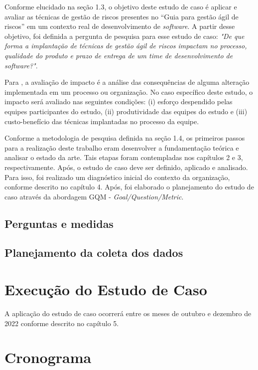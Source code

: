 \documentclass[
    12pt,       %
    openright,      %
    twoside,      %
    a4paper,      %
    english,      %
    french,       %
    spanish,      %
    brazil,       %
    ]{abntex2}
\begin{document}
Conforme elucidado na seção 1.3, o objetivo deste estudo de caso é aplicar e avaliar as técnicas de gestão de riscos presentes no “Guia para gestão ágil de riscos” \cite{Vieira:2020} em um contexto real de desenvolvimento de \textit{software}. A partir desse objetivo, foi definida a pergunta de pesquisa para esse estudo de caso: \textit{"De que forma a implantação de técnicas de gestão ágil de riscos impactam no processo, qualidade do produto e prazo de entrega de um time de desenvolvimento de software?"}. 

Para , a avaliação de impacto é a análise das consequências de alguma alteração implementada em um processo ou organização. No caso específico deste estudo, o impacto será avaliado nas seguintes condições: (i) esforço despendido pelas equipes participantes do estudo, (ii) produtividade das equipes do estudo e (iii) custo-benefício das técnicas implantadas no processo da equipe. 

Conforme a metodologia de pesquisa definida na seção 1.4, os primeiros passos para a realização deste trabalho eram desenvolver a fundamentação teórica e analisar o estado da arte. Tais etapas foram contempladas nos capítulos 2 e 3, respectivamente. Após, o estudo de caso deve ser definido, aplicado e analisado. Para isso, foi realizado um diagnóstico inicial do contexto da organização, conforme descrito no capítulo 4. Após, foi elaborado o planejamento do estudo de caso através da abordagem GQM - \textit{Goal/Question/Metric}.

\section{Perguntas e medidas}
\section{Planejamento da coleta dos dados}



\chapter{Execução do Estudo de Caso}
\label{sec:Experimentos}

A aplicação do estudo de caso ocorrerá entre os meses de outubro e dezembro de 2022 conforme descrito no capítulo 5.

\chapter{Cronograma}
\label{sec:Conclusoes}
\end{document}

